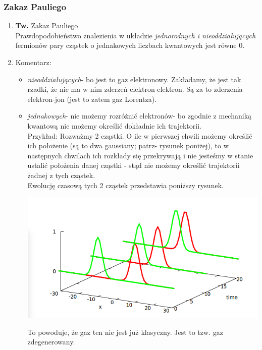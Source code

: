\subsubsection{Zakaz Pauliego}
\begin{enumerate}
\item \textbf{Tw.} Zakaz Pauliego\\ Prawdopodobieństwo znalezienia w układzie \emph{jednorodnych i nieoddziałujących} fermionów pary cząstek o jednakowych liczbach kwantowych jest równe 0.\\
 \item Komentarz:
\begin{itemize}
\item \emph{nieoddziałujących}- bo jest to gaz elektronowy. Zakładamy, że jest tak rzadki, że nie ma w nim zderzeń elektron-elektron. Są za to zderzenia elektron-jon (jest to zatem gaz Lorentza).
\item\emph{ jednakowych}- nie możemy rozróżnić elektronów- bo zgodnie z mechaniką kwantową nie możemy określić dokładnie ich trajektorii.\\
Przykład: Rozważmy 2 cząstki. O ile w pierwszej chwili możemy określić ich położenie (są to dwa gaussiany; patrz- rysunek poniżej), to w następnych chwilach   ich rozkłady się przekrywają i nie jesteśmy w stanie ustalić położenia danej cząstki - stąd nie możemy określić trajektorii żadnej z tych cząstek.\\
Ewolucję czasową tych 2 cząstek przedstawia poniższy rysunek.
\begin{center}\includegraphics[scale=0.75]{obrazki/wykl_7_obrazek_1.png}\end{center}
To powoduje, że gaz ten nie jest już klasyczny. Jest to tzw. gaz zdegenerowany.
\end{itemize}
\end{enumerate}

